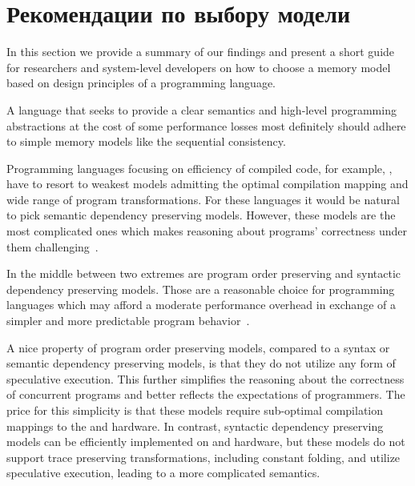 \section{Рекомендации по выбору модели}
\label{sec:discussion}

In this section we provide a summary of our findings
and present a short guide for researchers and system-level developers 
on how to choose a memory model based on 
design principles of a programming language.   

A language that seeks to provide a clear semantics and 
high-level programming abstractions at the cost 
of some performance losses most definitely should 
adhere to simple memory models like the sequential consistency. 

Programming languages focusing on efficiency 
of compiled code, for example, \CPP, 
have to resort to weakest models admitting 
the optimal compilation mapping 
and wide range of program transformations. 
For these languages it would be natural 
to pick semantic dependency preserving models.
However, these models are the most complicated ones
which makes reasoning about programs' correctness
under them challenging~\cite{Svendsen-al:ESOP18}.

In the middle between two extremes are program order preserving and 
syntactic dependency preserving models.
Those are a reasonable choice for programming languages
which may afford a moderate performance overhead 
in exchange of a simpler and more predictable program behavior~\cite{Ou-Demsky:OOPSLA18}.

A nice property of program order preserving models, compared 
to a syntax or semantic dependency preserving models, 
is that they do not utilize any form of speculative execution. 
This further simplifies the reasoning about the correctness
of concurrent programs and better reflects the 
expectations of programmers. 
The price for this simplicity is that 
these models require sub-optimal compilation mappings 
to the \ARM and \POWER hardware.
In contrast, syntactic dependency preserving models 
can be efficiently implemented on \ARM and \POWER hardware,
but these models do not support trace preserving transformations,
including constant folding, and utilize speculative execution, 
leading to a more complicated semantics.   


